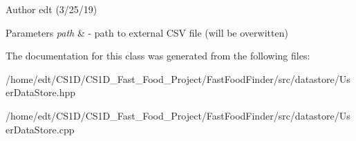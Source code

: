 \begin{DoxyAuthor}{Author}
edt (3/25/19)
\end{DoxyAuthor}

\begin{DoxyParams}{Parameters}
{\em path} & -\/ path to external C\-S\-V file (will be overwitten) \\
\hline
\end{DoxyParams}


The documentation for this class was generated from the following files\-:\begin{DoxyCompactItemize}
\item 
/home/edt/\-C\-S1\-D/\-C\-S1\-D\-\_\-\-Fast\-\_\-\-Food\-\_\-\-Project/\-Fast\-Food\-Finder/src/datastore/User\-Data\-Store.\-hpp\item 
/home/edt/\-C\-S1\-D/\-C\-S1\-D\-\_\-\-Fast\-\_\-\-Food\-\_\-\-Project/\-Fast\-Food\-Finder/src/datastore/User\-Data\-Store.\-cpp\end{DoxyCompactItemize}
